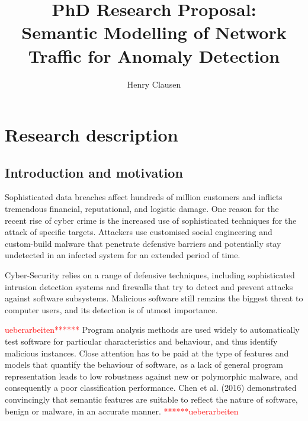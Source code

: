 \documentclass[a4paper,12pt,twoside]{report}
\makeatletter
\newcommand*{\toccontents}{\@starttoc{toc}}
\makeatother
\begin{document}
\title{\LARGE {\bf PhD Research Proposal:\\Semantic Modelling of Network Traffic for Anomaly Detection}\\
 \vspace*{-5mm}
}
\author{Henry Clausen}

\maketitle



\toccontents



\chapter{Research description}

\section{Introduction and motivation}



Sophisticated data breaches affect hundreds of million customers and inflicts tremendous financial, reputational, and logistic damage. One reason for the recent rise of cyber crime is the increased use of sophisticated techniques for the attack of specific targets. Attackers use customised social engineering and custom-build malware that penetrate defensive barriers and potentially stay undetected in an infected system for an extended period of time. 

Cyber-Security relies on a range of defensive techniques, including sophisticated intrusion detection systems and firewalls that try to detect and prevent attacks against software subsystems. Malicious software still remains the biggest threat to computer users, and its detection is of utmost importance. 


\textcolor{red}{ueberarbeiten******}
Program analysis methods are used widely to automatically test software for particular characteristics and behaviour, and thus identify malicious instances. Close attention has to be paid at the type of features and models that quantify the behaviour of software, as a lack of general program representation leads to low robustness against new or polymorphic malware, and consequently a poor classification performance.  Chen et al.  (2016) \cite{chen2016robust, chen2016more} demonstrated convincingly that semantic features are suitable to reflect the nature of software, benign or malware, in an accurate manner. \textcolor{red}{******ueberarbeiten}
\end{document}
